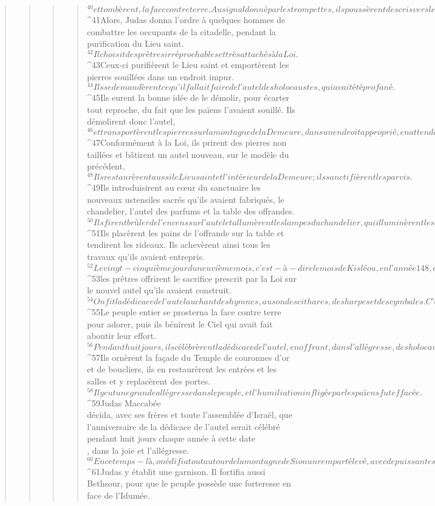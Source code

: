 \begin{verse}
\begin{verse}
\begin{verse}
\begin{verse}
${}^{40}et tombèrent, la face contre terre. Au signal donné par les trompettes, ils poussèrent des cris vers le Ciel.
${}^{41}Alors, Judas donna l’ordre à quelques hommes de combattre les occupants de la citadelle, pendant la purification du Lieu saint. 
${}^{42}Il choisit des prêtres irréprochables et très attachés à la Loi. 
${}^{43}Ceux-ci purifièrent le Lieu saint et emportèrent les pierres souillées dans un endroit impur. 
${}^{44}Ils se demandèrent ce qu’il fallait faire de l’autel des holocaustes, qui avait été profané. 
${}^{45}Ils eurent la bonne idée de le démolir, pour écarter tout reproche, du fait que les païens l’avaient souillé. Ils démolirent donc l’autel, 
${}^{46}et transportèrent les pierres sur la montagne de la Demeure, dans un endroit approprié, en attendant la venue d’un prophète qui se prononcerait à leur sujet. 
${}^{47}Conformément à la Loi, ils prirent des pierres non taillées et bâtirent un autel nouveau, sur le modèle du précédent. 
${}^{48}Ils restaurèrent aussi le Lieu saint et l’intérieur de la Demeure ; ils sanctifièrent les parvis. 
${}^{49}Ils introduisirent au cœur du sanctuaire les nouveaux ustensiles sacrés qu’ils avaient fabriqués, le chandelier, l’autel des parfums et la table des offrandes. 
${}^{50}Ils firent brûler de l’encens sur l’autel et allumèrent les lampes du chandelier, qui illuminèrent le sanctuaire. 
${}^{51}Ils placèrent les pains de l’offrande sur la table et tendirent les rideaux. Ils achevèrent ainsi tous les travaux qu’ils avaient entrepris.
${}^{52}Le vingt-cinquième jour du neuvième mois, c’est-à-dire le mois de Kisléou, en l’année 148, de grand matin, 
${}^{53}les prêtres offrirent le sacrifice prescrit par la Loi sur le nouvel autel qu’ils avaient construit. 
${}^{54}On fit la dédicace de l’autel au chant des hymnes, au son des cithares, des harpes et des cymbales. C’était juste l’anniversaire du jour où les païens l’avaient profané. 
${}^{55}Le peuple entier se prosterna la face contre terre pour adorer, puis ils bénirent le Ciel qui avait fait aboutir leur effort. 
${}^{56}Pendant huit jours, ils célébrèrent la dédicace de l’autel, en offrant, dans l’allégresse, des holocaustes, des sacrifices de communion et d’action de grâce. 
${}^{57}Ils ornèrent la façade du Temple de couronnes d’or et de boucliers, ils en restaurèrent les entrées et les salles et y replacèrent des portes. 
${}^{58}Il y eut une grande allégresse dans le peuple, et l’humiliation infligée par les païens fut effacée. 
${}^{59}Judas Maccabée\\décida, avec ses frères et toute l’assemblée d’Israël, que l’anniversaire de la dédicace de l’autel serait célébré pendant huit jours chaque année à cette date\\, dans la joie et l’allégresse.
${}^{60}En ce temps-là, on édifia tout autour de la montagne de Sion un rempart élevé, avec de puissantes tours, de peur que les païens ne viennent piétiner ces lieux comme auparavant. 
${}^{61}Judas y établit une garnison. Il fortifia aussi Bethsour, pour que le peuple possède une forteresse en face de l’Idumée.
      

\end{verse}
\end{verse}
\end{verse}
\end{verse}
